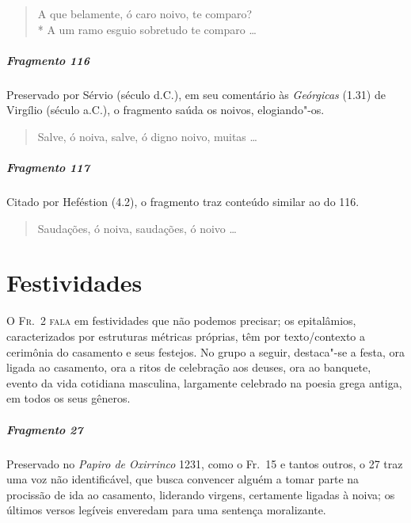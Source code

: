 \begin{verse}
A que belamente, ó caro noivo, te comparo?\\*
A um ramo esguio sobretudo te comparo \ldots{}
\end{verse}

\paragraph{Fragmento 116}

{\small Preservado por Sérvio (século  d.C.), em seu comentário às \textit{Geórgicas} (1.31) de Virgílio (século  a.C.), o fragmento saúda os noivos, elogiando"-os.}

\begin{verse}
Salve, ó noiva, salve, ó digno noivo, muitas \ldots{}
\end{verse}

\paragraph{Fragmento 117}

{\small Citado por Heféstion (4.2), o fragmento traz conteúdo similar ao do 116.}

\begin{verse}
Saudações, ó noiva, saudações, ó noivo \ldots{}
\end{verse}

\chapter{Festividades}

\textsc{O Fr.~2 fala} em festividades que não podemos precisar; os epitalâmios,
caracterizados por estruturas métricas próprias, têm por texto/contexto a
cerimônia do casamento e seus festejos. No grupo a seguir, destaca"-se a festa,
ora ligada ao casamento, ora a ritos de celebração aos deuses, ora ao banquete,
evento da vida cotidiana masculina, largamente celebrado na poesia grega
antiga, em todos os seus gêneros.

\paragraph{Fragmento 27}

{\small Preservado no \textit{Papiro de Oxirrinco} 1231, como o Fr.~15 e tantos outros, o 27 traz uma
voz não identificável, que busca convencer alguém a tomar parte na procissão de
ida ao casamento, liderando virgens, certamente ligadas à noiva; os últimos versos
legíveis enveredam para uma sentença moralizante.}

